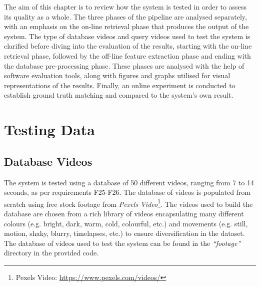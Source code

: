 The aim of this chapter is to review how the system is tested in order to assess its quality as a whole. The three phases of the pipeline are analysed separately, with an emphasis on the on-line retrieval phase that produces the output of the system. The type of database videos and query videos used to test the system is clarified before diving into the evaluation of the results, starting with the on-line retrieval phase, followed by the off-line feature extraction phase and ending with the database pre-processing phase. These phases are analysed with the help of software evaluation tools, along with figures and graphs utilised for visual representations of the results. Finally, an online experiment is conducted to establish ground truth matching and compared to the system's own result.


\section{Testing Data}

\subsection{Database Videos}

The system is tested using a database of 50 different videos, ranging from 7 to 14 seconds, as per requirements F25-F26. The database of videos is populated from scratch using free stock footage from \textit{Pexels Video}\footnote{Pexels Video: \url{https://www.pexels.com/videos/}}. The videos used to build the database are chosen from a rich library of videos encapsulating many different colours (e.g. bright, dark, warm, cold, colourful, etc.) and movements (e.g. still, motion, shaky, blurry, timelapses, etc.) to ensure diversification in the dataset. The database of videos used to test the system can be found in the \textit{``footage''} directory in the provided code.\\

